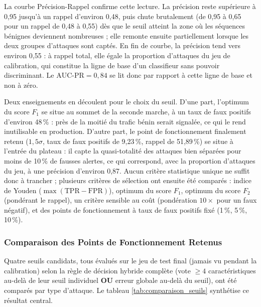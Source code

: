 La courbe Précision-Rappel confirme cette lecture. La précision reste supérieure à 0,95 jusqu'à un rappel d'environ 0,48, puis chute brutalement (de 0,95 à 0,65 pour un rappel de 0,48 à 0,55) dès que le seuil atteint la zone où les séquences bénignes deviennent nombreuses ; elle remonte ensuite partiellement lorsque les deux groupes d'attaques sont captés. En fin de courbe, la précision tend vers environ 0,55 : à rappel total, elle égale la proportion d'attaques du jeu de calibration, qui constitue la ligne de base d'un classifieur sans pouvoir discriminant. Le $\text{AUC-PR}=0,84$ se lit donc par rapport à cette ligne de base et non à zéro.

Deux enseignements en découlent pour le choix du seuil. D'une part, l'optimum du score $F_1$ se situe au sommet de la seconde marche, à un taux de faux positifs d'environ 48\,\% : près de la moitié du trafic bénin serait signalée, ce qui le rend inutilisable en production. D'autre part, le point de fonctionnement finalement retenu ($1,5\sigma$, taux de faux positifs de 9,23\,\%, rappel de 51,89\,\%) se situe à l'entrée du plateau : il capte la quasi-totalité des attaques bien séparées pour moins de 10\,\% de fausses alertes, ce qui correspond, avec la proportion d'attaques du jeu, à une précision d'environ 0,87. %
Aucun critère statistique unique ne suffit donc à trancher ; plusieurs critères de sélection ont ensuite été comparés : indice de Youden ($\max(\text{TPR}-\text{FPR})$), optimum du score $F_1$, optimum du score $F_2$ (pondérant le rappel), un critère sensible au coût (pondération $10\times$ pour un faux négatif), et des points de fonctionnement à taux de faux positifs fixé (1\,\%, 5\,\%, 10\,\%).


\subsubsection{Comparaison des Points de Fonctionnement Retenus}
Quatre seuils candidats, tous évalués sur le jeu de test final (jamais vu pendant la calibration) selon la règle de décision hybride complète (vote $\geq 4$ caractéristiques au-delà de leur seuil individuel \textbf{OU} erreur globale au-delà du seuil), ont été comparés par type d'attaque. Le tableau \ref{tab:comparaison_seuils} synthétise ce résultat central.

